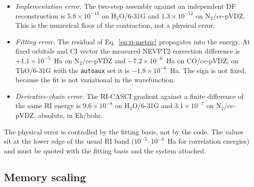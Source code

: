 \begin{itemize}
\item \emph{Implementation error.}  The two-step assembly against an
  independent DF reconstruction is $5.8\times10^{-13}$ on
  H$_2$O/6-31G and $1.3\times10^{-12}$ on N$_2$/cc-pVDZ.  This is the
  numerical floor of the contraction, not a physical error.
\item \emph{Fitting error.}  The residual of
  Eq.~\eqref{eq:ri-metric} propagates into the energy.  At fixed
  orbitals and CI vector the measured NEVPT2 correction difference is
  $+1.1\times10^{-5}$~Ha on N$_2$/cc-pVDZ and $-7.2\times10^{-6}$~Ha on
  CO/cc-pVDZ; on ThO/6-31G with the \texttt{autoaux} set it is
  $-1.8\times10^{-6}$~Ha.  The sign is not fixed, because the fit is
  not variational in the wavefunction.
\item \emph{Derivative-chain error.}  The RI-CASCI gradient against a
  finite difference of the same RI energy is $9.6\times10^{-8}$ on
  H$_2$O/6-31G and $3.1\times10^{-7}$ on N$_2$/cc-pVDZ, absolute, in
  Eh/bohr.
\end{itemize}

The physical error is controlled by the fitting basis, not by the code.
The values sit at the lower edge of the usual RI band
($10^{-5}$--$10^{-3}$~Ha for correlation energies) and must be quoted
with the fitting basis and the system attached.

\subsection{Memory scaling}

